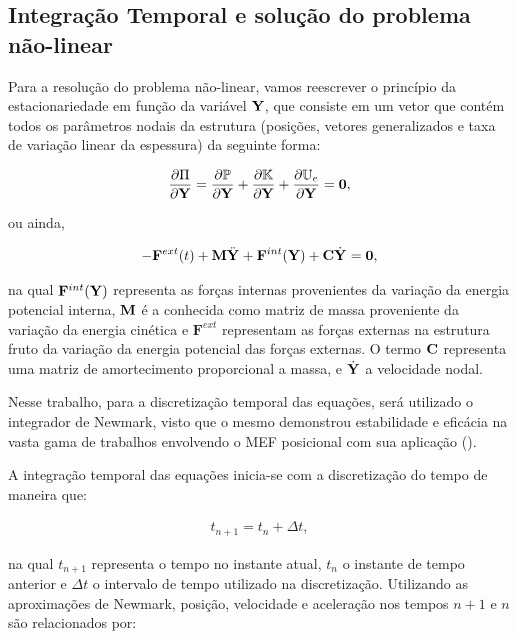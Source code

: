 \subsection{Integração Temporal e solução do problema não-linear}

Para a resolução do problema não-linear, vamos reescrever o princípio da estacionariedade em função da variável $\mathbf{Y}$, que consiste em um vetor que contém todos os parâmetros nodais da estrutura (posições, vetores generalizados e taxa de variação linear da espessura) da seguinte forma:

\begin{align}
	\frac{\partial\Pi}{\partial\mathbf{Y}} = \frac{\partial\mathbb{P}}{\partial \mathbf{Y}} + \frac{\partial\mathbb{K}}{\partial \mathbf{Y}} + \frac{\partial\mathbb{U}_e}{\partial \mathbf{Y}} = \mathbf{0},
\end{align}

\noindent ou ainda,

\begin{align}
	- \mathbf{F}^{ext}(t) + \mathbf{M}\ddot{\mathbf{Y}}_{}+ \mathbf{F}^{int}(\mathbf{Y}) + \mathbf{C}\dot{\mathbf{Y}}_{} = \mathbf{0}, \label{eq:equi_forma_matricial}
\end{align}

\noindent na qual $ \mathbf{F}^{int}(\mathbf{Y})$ representa as forças internas provenientes da variação da energia potencial interna, $\mathbf{M}$ é a conhecida como matriz de massa proveniente da variação da energia cinética e $\mathbf{F}^{ext}$ representam as forças externas na estrutura fruto da variação da energia potencial das forças externas. O termo $\mathbf{C}$ representa uma matriz de amortecimento proporcional a massa, e $\dot{\mathbf{Y}}_{}$ a velocidade nodal.

Nesse trabalho, para a discretização temporal das equações, será utilizado o integrador de Newmark, visto que o mesmo demonstrou estabilidade e eficácia na vasta gama de trabalhos envolvendo o MEF posicional com sua aplicação (\cite{CodaG:2004,CodaP:2010,CarrazedoC:2010,CodaP:2011,SanchesC:2016}).
  
A integração temporal das equações inicia-se com a discretização do tempo de maneira que:

\begin{align}
	t_{n+1} = t_{n} + \Delta t, \label{eq:disc_tempo}
\end{align}

\noindent na qual $t_{n+1}$ representa o tempo no instante atual, $t_{n}$ o instante de tempo anterior e  $\Delta t$ o intervalo de tempo utilizado na discretização. Utilizando as aproximações de Newmark, posição, velocidade e aceleração nos tempos $n+1$ e $n$ são relacionados por:

